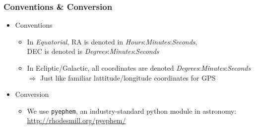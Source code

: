 \begin{frame}
\frametitle{Conventions \& Conversion}
\begin{itemize}
\item Conventions
	\begin{itemize}
	\item In \emph{Equatorial}, RA is denoted in \emph{Hours}:\emph{Minutes}:\emph{Seconds},\\
	 DEC is denoted is \emph{Degrees}:\emph{Minutes}:\emph{Seconds}
	\item In Ecliptic/Galactic, all coordinates are denoted \emph{Degrees}:\emph{Minutes}:\emph{Seconds}\\
	$\Longrightarrow$ Just like familiar lattitude/longitude coordinates for GPS
	\end{itemize}
\item Conversion
	\begin{itemize}
	\item We use \texttt{pyephem}, an industry-standard python module in astronomy:\\
	\url{http://rhodesmill.org/pyephem/}
	\end{itemize}
\end{itemize}
\end{frame}
